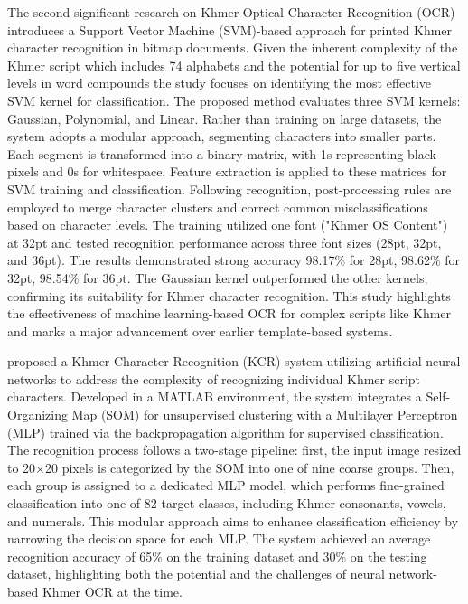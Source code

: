 {\citet{Sok&Taing2014} The second significant research on 
Khmer Optical Character Recognition (OCR) introduces a Support 
Vector Machine (SVM)-based approach for printed Khmer character 
recognition in bitmap documents. Given the inherent complexity 
of the Khmer script which includes 74 alphabets and the potential 
for up to five vertical levels in word compounds the study focuses 
on identifying the most effective SVM kernel for classification.
The proposed method evaluates three SVM kernels: Gaussian, Polynomial, 
and Linear. Rather than training on large datasets, the system adopts 
a modular approach, segmenting characters into smaller parts. Each 
segment is transformed into a binary matrix, with 1s representing 
black pixels and 0s for whitespace. Feature extraction is applied 
to these matrices for SVM training and classification.
Following recognition, post-processing rules are employed to merge 
character clusters and correct common misclassifications based on 
character levels. The training utilized one font ("Khmer OS Content") 
at 32pt and tested recognition performance across three font sizes 
(28pt, 32pt, and 36pt). The results demonstrated strong accuracy
98.17\% for 28pt, 98.62\% for 32pt, 98.54\% for 36pt.
The Gaussian kernel outperformed the other kernels, confirming its 
suitability for Khmer character recognition. This study highlights 
the effectiveness of machine learning-based OCR for complex scripts 
like Khmer and marks a major advancement over earlier template-based 
systems.

\citet{Meng_Hann_2014} proposed a Khmer Character Recognition (KCR) 
system utilizing artificial neural networks to address the complexity 
of recognizing individual Khmer script characters. Developed in a 
MATLAB environment, the system integrates a Self-Organizing Map (SOM) 
for unsupervised clustering with a Multilayer Perceptron (MLP) 
trained via the backpropagation algorithm for supervised classification. 
The recognition process follows a two-stage pipeline: first, the input 
image resized to 20×20 pixels is categorized by the SOM into one of 
nine coarse groups. Then, each group is assigned to a dedicated MLP 
model, which performs fine-grained classification into one of 82 
target classes, including Khmer consonants, vowels, and numerals. 
This modular approach aims to enhance classification efficiency by 
narrowing the decision space for each MLP. The system achieved an 
average recognition accuracy of 65\% on the training dataset and 
30\% on the testing dataset, highlighting both the potential and 
the challenges of neural network-based Khmer OCR at the time.

}
